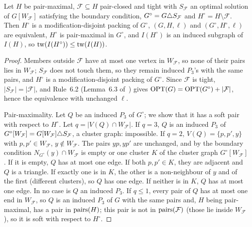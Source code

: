 \begin{lemma}\label{lem:premax}
Let $H$ be pair-maximal, $\mathcal F\subseteq H$ pair-closed and tight with $S_{\mathcal F}$ an optimal solution of $G[W_{\mathcal F}]$ satisfying the boundary condition, $G^\circ=G\triangle S_{\mathcal F}$ and $H^\circ=H\setminus\mathcal F$. Then $H^\circ$ is a modification-disjoint packing of $G^\circ$, $(G,H,\ell)$ and $(G^\circ,H^\circ,\ell)$ are equivalent, $H^\circ$ is pair-maximal in $G^\circ$, and $I(H^\circ)$ is an induced subgraph of $I(H)$, so $\mathrm{tw}(I(H^\circ))\le\mathrm{tw}(I(H))$.
\end{lemma}
\begin{proof}
Members outside $\mathcal F$ have at most one vertex in $W_{\mathcal F}$, so none of their pairs lies in $W_{\mathcal F}$; $S_{\mathcal F}$ does not touch them, so they remain induced $P_3$'s with the same pairs, and $H^\circ$ is a modification-disjoint packing of $G^\circ$. Since $\mathcal F$ is tight, $|S_{\mathcal F}|=|\mathcal F|$, and Rule~6.2 (Lemma~6.3 of~\cite{BFK18}) gives $\mathrm{OPT}(G)=\mathrm{OPT}(G^\circ)+|\mathcal F|$, hence the equivalence with unchanged $\ell$.

Pair-maximality. Let $Q$ be an induced $P_3$ of $G^\circ$; we show that it has a soft pair with respect to $H^\circ$. Let $q=|V(Q)\cap W_{\mathcal F}|$.
If $q=3$, $Q$ is an induced $P_3$ of $G^\circ[W_{\mathcal F}]=G[W_{\mathcal F}]\triangle S_{\mathcal F}$, a cluster graph: impossible.
If $q=2$, $V(Q)=\{p,p',y\}$ with $p,p'\in W_{\mathcal F}$, $y\notin W_{\mathcal F}$. The pairs $yp,yp'$ are unchanged, and by the boundary condition $N_{G^\circ}(y)\cap W_{\mathcal F}$ is empty or one cluster $K$ of the cluster graph $G^\circ[W_{\mathcal F}]$. If it is empty, $Q$ has at most one edge. If both $p,p'\in K$, they are adjacent and $Q$ is a triangle. If exactly one is in $K$, the other is a non-neighbour of $y$ and of the first (different clusters), so $Q$ has one edge. If neither is in $K$, $Q$ has at most one edge. In no case is $Q$ an induced $P_3$.
If $q\le1$, every pair of $Q$ has at most one end in $W_{\mathcal F}$, so $Q$ is an induced $P_3$ of $G$ with the same pairs and, $H$ being pair-maximal, has a pair in $\mathrm{pairs}(H)$; this pair is not in $\mathrm{pairs}(\mathcal F)$ (those lie inside $W_{\mathcal F}$), so it is soft with respect to $H^\circ$.
\end{proof}

